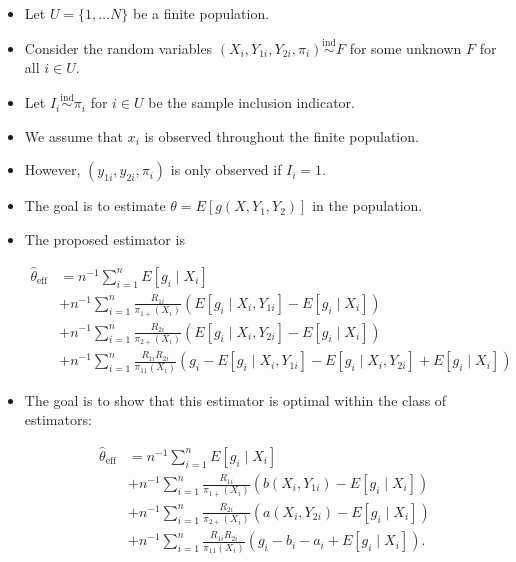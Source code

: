 \documentclass[12pt]{article}
\begin{document}
\begin{itemize}
  \item Let $U = \{1, \dots N\}$ be a finite population.
  \item Consider the random variables $(X_i, Y_{1i}, Y_{2i}, \pi_i) 
    \stackrel{\text{ind}}{\sim} F$ for some unknown $F$ for all $i \in U$.
  \item Let $I_i \stackrel{\text{ind}}{\sim} \pi_i$ for $i \in U$ be the 
    sample inclusion indicator.
  \item We assume that $x_i$ is observed throughout the finite population.
  \item However, $(y_{1i}, y_{2i}, \pi_i)$ is only observed if $I_i = 1$.
  \item The goal is to estimate $\theta = E[g(X, Y_1, Y_2)]$ in the population.
  \item The proposed estimator is

  \begin{align}\label{eq:prop}
    \hat \theta_{\text{eff}} 
    &= n^{-1} \sum_{i = 1}^n E[g_i \mid X_i] \nonumber \\ 
    &+ n^{-1} \sum_{i = 1}^n \frac{R_{1i}}{\pi_{1+}(X_i)}
      (E[g_i \mid X_i, Y_{1i}] - E[g_i \mid X_i])\nonumber  \\ 
    &+ n^{-1} \sum_{i = 1}^n \frac{R_{2i}}{\pi_{2+}(X_i)}
      (E[g_i \mid X_i, Y_{2i}] - E[g_i \mid X_i])\nonumber  \\ 
    &+ n^{-1} \sum_{i = 1}^n \frac{R_{1i} R_{2i}}{\pi_{11}(X_i)}
      (g_i - E[g_i \mid X_i, Y_{1i}] - E[g_i \mid X_i, Y_{2i}] + E[g_i \mid X_i])
  \end{align}
  
  \item The goal is to show that this estimator is optimal within the class
    of estimators:

  \begin{align*}
    \hat \theta_{\text{eff}} 
    &= n^{-1} \sum_{i = 1}^n E[g_i \mid X_i] \\ 
    &+ n^{-1} \sum_{i = 1}^n \frac{R_{1i}}{\pi_{1+}(X_i)}
      (b(X_i, Y_{1i}) - E[g_i \mid X_i]) \\ 
    &+ n^{-1} \sum_{i = 1}^n \frac{R_{2i}}{\pi_{2+}(X_i)}
      (a(X_i, Y_{2i}) - E[g_i \mid X_i]) \\ 
    &+ n^{-1} \sum_{i = 1}^n \frac{R_{1i} R_{2i}}{\pi_{11}(X_i)}
      (g_i - b_i - a_i + E[g_i \mid X_i]).
  \end{align*}

\end{itemize}
\end{document}
